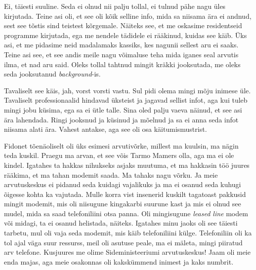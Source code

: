 
Ei, täiesti suuline. Seda ei olnud nii palju tollal, ei tulnud pähe nagu üles kirjutada. Teine asi oli, et see oli kõik selline info,  mida sa niisama ära ei andnud, sest see tõstis sind teistest kõrgemale. Näiteks see, et me oskasime residentseid programme kirjutada, ega me nendele tädidele ei rääkinud, kuidas see käib. Üks asi, et me pidasime neid madalamaks kassiks, kes nagunii sellest aru ei saaks. Teine asi see, et see andis meile nagu võimaluse teha mida iganes seal arvutis ilma, et nad aru said. Oleks tollal tahtnud mingit kräkki jooksutada, me oleks seda jooksutanud \emph{background}-is.


Tavaliselt see käis, jah, vorst vorsti vastu.  Sul pidi olema mingi mõju inimese üle. Tavaliselt professionaalid hindavad üksteist ja jagavad sellist infot, aga kui tuleb mingi jobu küsima, ega sa ei ütle talle. Sina oled palju vaeva näinud, et see asi ära lahendada. Ringi jooksnud ja küsinud ja mõelnud ja sa ei anna seda infot niisama alati ära. Vahest antakse, aga see oli osa käitumismustrist. 

Fidonet tõenäoliselt oli üks esimesi arvutivõrke, millest ma kuulsin, ma nägin teda kuskil. Praegu ma arvan, et see võis Tarmo Mamers olla, aga ma ei ole kindel. Igatahes ta hakkas nihukseks asjaks muutuma, et ma hakkasin töö juures rääkima, et ma tahan modemit saada. Ma tahaks nagu võrku. Ja meie arvutuskeskus ei pidanud seda kuidagi vajalikuks ja ma ei osanud seda kuhugi õigesse kohta ka vajutada. Mulle korra vist insenerid kuskilt tagatoast pakkusid mingit modemit, mis oli niisugune kingakarbi suurune kast ja mis ei olnud see mudel, mida sa saad telefoniliini otsa panna. Oli mingisugune \emph{leased line} modem või midagi, ta ei osanud helistada, näiteks. Igatahes minu jaoks oli see täiesti tarbetu,  mul oli vaja seda modemit, mis käib telefoniliini külge. Telefoniliin oli ka tol ajal väga suur ressurss, meil oli asutuse peale, ma ei mäleta, mingi piiratud arv telefone. Kusjuures me olime Sideministeeriumi arvutuskeskus! Jaam oli meie enda majas, aga meie osakonnas oli kakskümmend inimest ja kaks numbrit. 


